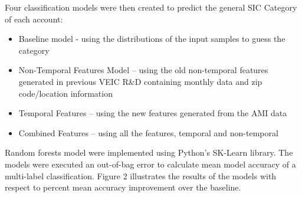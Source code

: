 Four classification models were then created to predict the general SIC Category of each account:
\begin{itemize}
\item Baseline model - using the distributions of the input samples to guess the category
\item Non-Temporal Features Model – using the old non-temporal features generated in previous VEIC R&D containing monthly data and zip code/location information
\item Temporal Features – using the new features generated from the AMI data
\item Combined Features – using all the features, temporal and non-temporal
\end{itemize}

Random forests model were implemented using Python’s SK-Learn library. The models were executed an out-of-bag error to calculate mean model accuracy of a multi-label classification. Figure 2 illustrates the results of the models with respect to percent mean accuracy improvement over the baseline.
